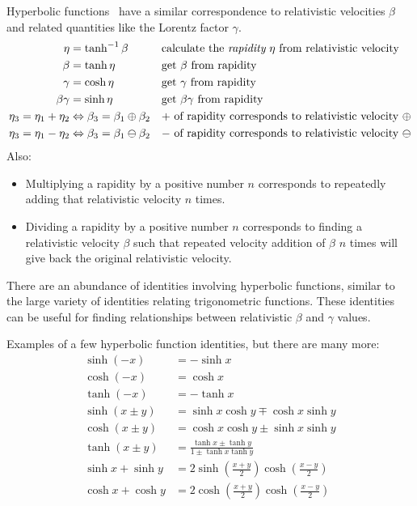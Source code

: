 \documentclass[a4paper]{article}
\theoremstyle{plain}
\theoremstyle{definition}
\begin{document}
Hyperbolic functions~\cite{WikipediaHyperbolicFunctions} have a
similar correspondence to relativistic velocities $\beta$ and related
quantities like the Lorentz factor $\gamma$.
\begin{align}
\eta & = \tanh^{-1} \beta & & \text{calculate the {\em rapidity} $\eta$ from relativistic velocity} \\
\beta & = \tanh \eta & & \text{get $\beta$ from rapidity} \\
\gamma & = \cosh \eta & & \text{get $\gamma$ from rapidity} \\
\beta \gamma & = \sinh \eta & & \text{get $\beta \gamma$ from rapidity} \\
\eta_3 = \eta_1 + \eta_2 & \Leftrightarrow \beta_3 = \beta_1 \oplus \beta_2 & & \text{$+$ of rapidity corresponds to relativistic velocity $\oplus$} \\
\eta_3 = \eta_1 - \eta_2 & \Leftrightarrow \beta_3 = \beta_1 \ominus \beta_2 & & \text{$-$ of rapidity corresponds to relativistic velocity $\ominus$}
\end{align}
Also:
\begin{itemize}
\item Multiplying a rapidity by a positive number $n$ corresponds to
  repeatedly adding that relativistic velocity $n$ times.
\item Dividing a rapidity by a positive number $n$ corresponds to
  finding a relativistic velocity $\beta$ such that repeated velocity
  addition of $\beta$ $n$ times will give back the original
  relativistic velocity.
\end{itemize}
There are an abundance of identities involving hyperbolic functions,
similar to the large variety of identities relating trigonometric
functions.  These identities can be useful for finding relationships
between relativistic $\beta$ and $\gamma$ values.

Examples of a few hyperbolic function identities, but there are many
more:
\begin{align}
\sinh (-x) & = -\sinh x \\
\cosh (-x) & = \cosh x \\
\tanh (-x) & = - \tanh x \\
\sinh (x \pm y) & = \sinh x \cosh y \mp \cosh x \sinh y \\
\cosh (x \pm y) & = \cosh x \cosh y \pm \sinh x \sinh y \\
\tanh (x \pm y) & = \frac{\tanh x \pm \tanh y}{1 \pm \tanh x \tanh y} \\
\sinh x + \sinh y & = 2 \sinh (\frac{x+y}{2} ) \cosh (\frac{x-y}{2}) \\
\cosh x + \cosh y & = 2 \cosh (\frac{x+y}{2} ) \cosh (\frac{x-y}{2})
\end{align}
\end{document}
